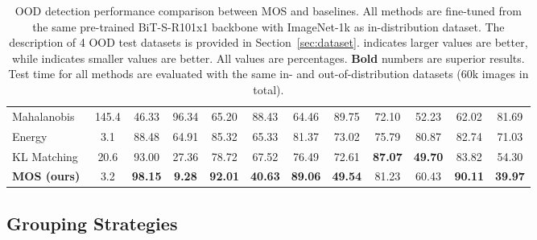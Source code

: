 \documentclass[final]{cvpr}
\begin{document}
\begin{table*}[ht]
{\begin{tabular}{l|c|cc|cc|cc|cc|cc}
Mahalanobis~\cite{lee2018simple}                      & 145.4                                                                                  & 46.33                & 96.34                 & 65.20                & 88.43                 & 64.46                & 89.75                 & 72.10                & 52.23                 & 62.02                & 81.69                \\
Energy~\cite{liu2020energy}                           & 3.1                                                                                    & 88.48                & 64.91                 & 85.32                & 65.33                 & 81.37                & 73.02                 & 75.79                & 80.87                 & 82.74                & 71.03                \\
KL Matching~\cite{hendrycks2019benchmark}                      & 20.6                                                                                   & 93.00                & 27.36                 & 78.72                & 67.52                 & 76.49                & 72.61                 & \textbf{87.07}       & \textbf{49.70}        & 83.82                & 54.30                \\ \midrule
\textbf{MOS (ours)}                       & 3.2                                                                                    & \textbf{98.15}       & \textbf{9.28}         & \textbf{92.01}       & \textbf{40.63}        & \textbf{89.06}       & \textbf{49.54}        & 81.23                & 60.43                 & \textbf{90.11}       & \textbf{39.97}       \\ \bottomrule
\end{tabular}

}
\caption{\small{OOD detection performance comparison between MOS and baselines. All methods are fine-tuned from the same pre-trained BiT-S-R101x1 backbone with ImageNet-1k as in-distribution dataset. The description of 4 OOD test datasets is provided in Section~\ref{sec:dataset}.  indicates larger values are better, while  indicates smaller values are better. All values are percentages. \textbf{Bold} numbers are superior results. Test time for all methods are evaluated with the same in- and out-of-distribution datasets (60k images in total). }} \label{table:main_result}
\vspace{-0.3cm}
\end{table*}



\subsection{Grouping Strategies}
\label{sec:grouping}
\end{document}
